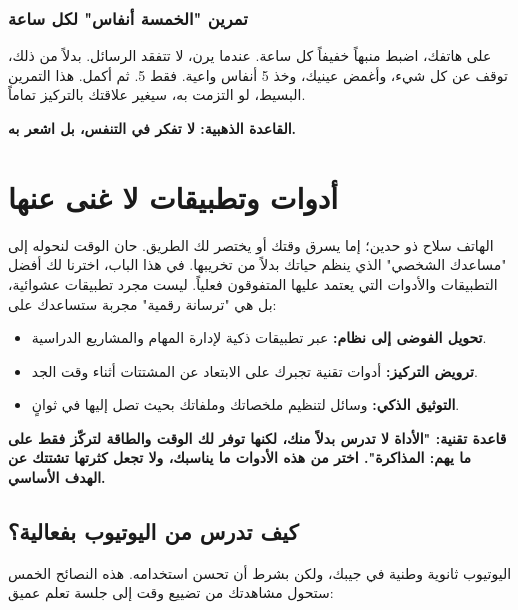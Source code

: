 \documentclass[12pt,a4paper]{book}
\newcommand{\importantAr}[1]{%
	\begin{important}
		\bfseries #1
	\end{important}
}
\begin{document}
	\subsection{تمرين "الخمسة أنفاس" لكل ساعة}
	
	على هاتفك، اضبط منبهاً خفيفاً كل ساعة. عندما يرن، لا تتفقد الرسائل. بدلاً من ذلك، توقف عن كل شيء، وأغمض عينيك، وخذ 5 أنفاس واعية. فقط 5. ثم أكمل. هذا التمرين البسيط، لو التزمت به، سيغير علاقتك بالتركيز تماماً.
	
	\importantAr{القاعدة الذهبية: لا تفكر في التنفس، بل اشعر به.}

\chapter{أدوات وتطبيقات لا غنى عنها}
\label{sec:owner-experiences9}
\label{chap:apps}

الهاتف سلاح ذو حدين؛ إما يسرق وقتك أو يختصر لك الطريق. حان الوقت لنحوله إلى "مساعدك الشخصي" الذي ينظم حياتك بدلاً من تخريبها. في هذا الباب، اخترنا لك أفضل التطبيقات والأدوات التي يعتمد عليها المتفوقون فعلياً. ليست مجرد تطبيقات عشوائية، بل هي "ترسانة رقمية" مجربة ستساعدك على:

\begin{itemize}
	\item \textbf{تحويل الفوضى إلى نظام:} عبر تطبيقات ذكية لإدارة المهام والمشاريع الدراسية.
	\item \textbf{ترويض التركيز:} أدوات تقنية تجبرك على الابتعاد عن المشتتات أثناء وقت الجد.
	\item \textbf{التوثيق الذكي:} وسائل لتنظيم ملخصاتك وملفاتك بحيث تصل إليها في ثوانٍ.
\end{itemize}

\importantAr{قاعدة تقنية: "الأداة لا تدرس بدلاً منك، لكنها توفر لك الوقت والطاقة لتركّز فقط على ما يهم: المذاكرة". اختر من هذه الأدوات ما يناسبك، ولا تجعل كثرتها تشتتك عن الهدف الأساسي.}

\section{كيف تدرس من اليوتيوب بفعالية؟}
\label{sec:youtube-study-tips}

اليوتيوب ثانوية وطنية في جيبك، ولكن بشرط أن تحسن استخدامه. هذه النصائح الخمس ستحول مشاهدتك من تضييع وقت إلى جلسة تعلم عميق:
\end{document}
